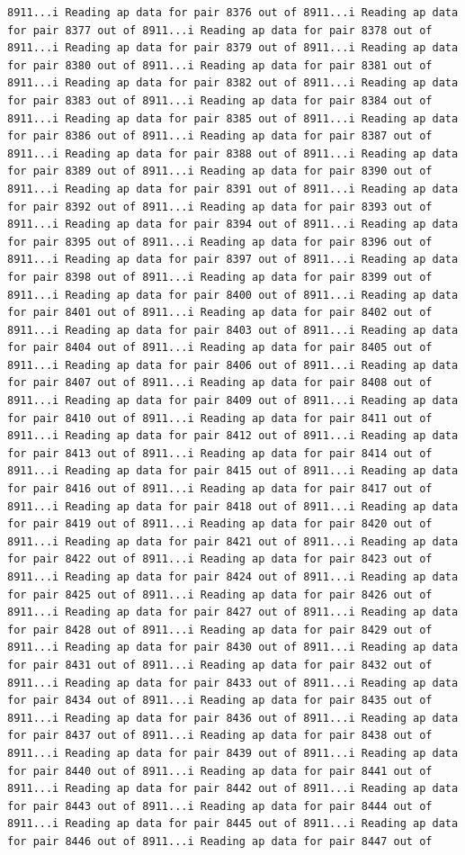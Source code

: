 \documentclass[
]{article}
\begin{document}
\begin{verbatim}
8911...i Reading ap data for pair 8376 out of 8911...i Reading ap data for pair 8377 out of 8911...i Reading ap data for pair 8378 out of 8911...i Reading ap data for pair 8379 out of 8911...i Reading ap data for pair 8380 out of 8911...i Reading ap data for pair 8381 out of 8911...i Reading ap data for pair 8382 out of 8911...i Reading ap data for pair 8383 out of 8911...i Reading ap data for pair 8384 out of 8911...i Reading ap data for pair 8385 out of 8911...i Reading ap data for pair 8386 out of 8911...i Reading ap data for pair 8387 out of 8911...i Reading ap data for pair 8388 out of 8911...i Reading ap data for pair 8389 out of 8911...i Reading ap data for pair 8390 out of 8911...i Reading ap data for pair 8391 out of 8911...i Reading ap data for pair 8392 out of 8911...i Reading ap data for pair 8393 out of 8911...i Reading ap data for pair 8394 out of 8911...i Reading ap data for pair 8395 out of 8911...i Reading ap data for pair 8396 out of 8911...i Reading ap data for pair 8397 out of 8911...i Reading ap data for pair 8398 out of 8911...i Reading ap data for pair 8399 out of 8911...i Reading ap data for pair 8400 out of 8911...i Reading ap data for pair 8401 out of 8911...i Reading ap data for pair 8402 out of 8911...i Reading ap data for pair 8403 out of 8911...i Reading ap data for pair 8404 out of 8911...i Reading ap data for pair 8405 out of 8911...i Reading ap data for pair 8406 out of 8911...i Reading ap data for pair 8407 out of 8911...i Reading ap data for pair 8408 out of 8911...i Reading ap data for pair 8409 out of 8911...i Reading ap data for pair 8410 out of 8911...i Reading ap data for pair 8411 out of 8911...i Reading ap data for pair 8412 out of 8911...i Reading ap data for pair 8413 out of 8911...i Reading ap data for pair 8414 out of 8911...i Reading ap data for pair 8415 out of 8911...i Reading ap data for pair 8416 out of 8911...i Reading ap data for pair 8417 out of 8911...i Reading ap data for pair 8418 out of 8911...i Reading ap data for pair 8419 out of 8911...i Reading ap data for pair 8420 out of 8911...i Reading ap data for pair 8421 out of 8911...i Reading ap data for pair 8422 out of 8911...i Reading ap data for pair 8423 out of 8911...i Reading ap data for pair 8424 out of 8911...i Reading ap data for pair 8425 out of 8911...i Reading ap data for pair 8426 out of 8911...i Reading ap data for pair 8427 out of 8911...i Reading ap data for pair 8428 out of 8911...i Reading ap data for pair 8429 out of 8911...i Reading ap data for pair 8430 out of 8911...i Reading ap data for pair 8431 out of 8911...i Reading ap data for pair 8432 out of 8911...i Reading ap data for pair 8433 out of 8911...i Reading ap data for pair 8434 out of 8911...i Reading ap data for pair 8435 out of 8911...i Reading ap data for pair 8436 out of 8911...i Reading ap data for pair 8437 out of 8911...i Reading ap data for pair 8438 out of 8911...i Reading ap data for pair 8439 out of 8911...i Reading ap data for pair 8440 out of 8911...i Reading ap data for pair 8441 out of 8911...i Reading ap data for pair 8442 out of 8911...i Reading ap data for pair 8443 out of 8911...i Reading ap data for pair 8444 out of 8911...i Reading ap data for pair 8445 out of 8911...i Reading ap data for pair 8446 out of 8911...i Reading ap data for pair 8447 out of 
\end{verbatim}
\end{document}
